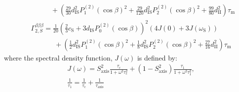 \begin{appendixtext}
\begin{equation*}
\begin{split}
&\hspace{41pt}+ \left(\frac{29}{30}d_{\text{IS}}^2P_1^{(2)}(\cos\beta)^2+\frac{29}{120}d_{\text{IS}}^2P_2^{(2)}(\cos\beta)^2+\frac{99}{80}d_{\text{II}}^2\right)\tau_{\text{m}}
\end{split}
\end{equation*}
\begin{equation*}
\begin{split}
&\Gamma_{2,S}^{\beta\beta\beta} = \frac{1}{20}\left(\frac{2}{3}c_{\text{S}}+3d_{\text{IS}}P_0^{(2)}(\cos\beta)\right)^2\left(4J(0)+3J(\omega_{\text{S}})\right) \\
&\hspace{41pt}+ \left(\frac{1}{2}d_{\text{IS}}^2P_1^{(2)}(\cos\beta)^2+\frac{1}{8}d_{\text{IS}}^2P_2^{(2)}(\cos\beta)^2+\frac{27}{16}d_{\text{II}}^2\right)\tau_{\text{m}}
\end{split}
\end{equation*}
where the spectral density function, $J(\omega)$ is defined by:
\begin{equation*}
\begin{split}
&J(\omega)=S_{\text{axis}}^2\frac{\tau_{\text{c}}}{1+\omega^2\tau_{\text{c}}^2}+(1-S_{\text{axis}}^2)\frac{\tau_1}{1+\omega^2\tau_1^2}, \\
&\frac{1}{\tau_1}=\frac{1}{\tau_{\text{c}}}+\frac{1}{\tau_{\text{axis}}}
\end{split}
\end{equation*}
\begin{singlespacing}
\printappendixbibliography
\end{singlespacing}
\end{appendixtext}

